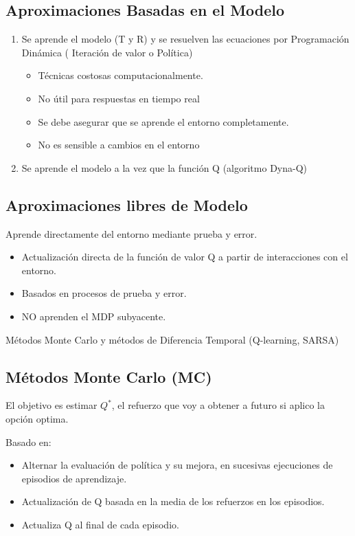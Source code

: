 \documentclass[12pt]{report} %
\begin{document}
\subsection{Aproximaciones Basadas en el Modelo}
\begin{enumerate}
  \item Se aprende el modelo (T y R) y se resuelven las ecuaciones por Programación Dinámica ( Iteración de valor o Política)
  \begin{itemize}
    \item Técnicas costosas computacionalmente.
    \item No útil para respuestas en tiempo real
    \item Se debe asegurar que se aprende el entorno completamente.
    \item No es sensible a cambios en el entorno 
  \end{itemize}
  \item Se aprende el modelo a la vez que la función Q (algoritmo Dyna-Q)
\end{enumerate}

\subsection{Aproximaciones libres de Modelo}
Aprende directamente del entorno mediante prueba y error.
\begin{itemize}
  \item Actualización directa de la función de valor Q a partir de interacciones con el entorno.
  \item Basados en procesos de prueba y error.
  \item NO aprenden el MDP subyacente.
\end{itemize}
Métodos Monte Carlo y métodos de Diferencia Temporal (Q-learning, SARSA)

\subsection{Métodos Monte Carlo (MC)}
El objetivo es estimar $Q^*$, el refuerzo que voy a obtener a futuro si aplico la opción optima.

Basado en: 
\begin{itemize}
  \item Alternar la evaluación de política y su mejora, en sucesivas ejecuciones de episodios de aprendizaje.
  \item Actualización de Q basada en la media de los refuerzos en los episodios.
  \item Actualiza Q al final de cada episodio.
\end{itemize}
\end{document}

